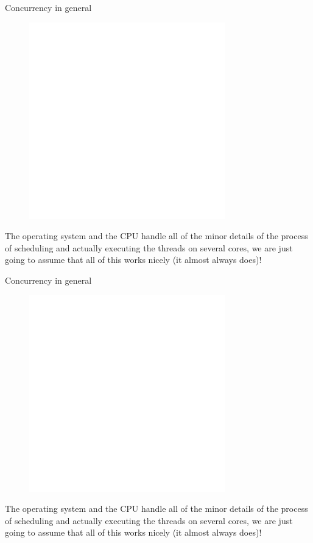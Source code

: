 \documentclass[usenames,dvipsnames,10pt,aspectratio=169]{beamer}
\begin{document}
\begin{frame}{Concurrency in general}
\begin{figure}
\centering
\includegraphics[width=0.7\linewidth]{graphics/process3.png}
\end{figure}
	
\large
The operating system and the CPU handle all of
the minor details of the process of scheduling
and actually executing the threads on several
cores, we are just going to assume that all of this
works nicely (it almost always does)!
\vspace{2.8cm}
\end{frame}

\begin{frame}{Concurrency in general}
\begin{figure}
\centering
\includegraphics[width=0.7\linewidth]{graphics/process4.png}
\end{figure}
	
\large
The operating system and the CPU handle all of
the minor details of the process of scheduling
and actually executing the threads on several
cores, we are just going to assume that all of this
works nicely (it almost always does)!
\vspace{2.8cm}
\end{frame}
\end{document}
